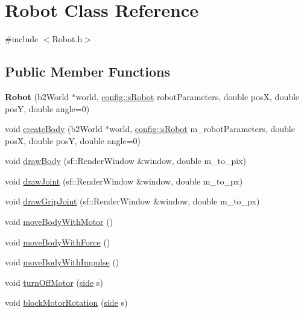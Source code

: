 \hypertarget{class_robot}{}\section{Robot Class Reference}
\label{class_robot}


{\ttfamily \#include $<$Robot.\+h$>$}

\subsection*{Public Member Functions}
\begin{DoxyCompactItemize}
\item 
\mbox{\label{class_robot_ac12d142fb87c4985e61f31c3684fe858}} 
{\bfseries Robot} (b2\+World $\ast$world, \mbox{\hyperlink{structconfig_1_1s_robot}{config\+::s\+Robot}} robot\+Parameters, double posX, double posY, double angle=0)
\item 
void \mbox{\hyperlink{class_robot_a7be383b14986610db597c2b26c475cbe}{create\+Body}} (b2\+World $\ast$world, \mbox{\hyperlink{structconfig_1_1s_robot}{config\+::s\+Robot}} m\+\_\+robot\+Parameters, double posX, double posY, double angle=0)
\item 
void \mbox{\hyperlink{class_robot_aae700fce06eb367ff9282492cc17ccc7}{draw\+Body}} (sf\+::\+Render\+Window \&window, double m\+\_\+to\+\_\+pix)
\item 
void \mbox{\hyperlink{class_robot_a94bec26489e5354d1b9106bbd0e59f00}{draw\+Joint}} (sf\+::\+Render\+Window \&window, double m\+\_\+to\+\_\+px)
\item 
void \mbox{\hyperlink{class_robot_a99e6a9dacaae1c43f249a01485352dcf}{draw\+Grip\+Joint}} (sf\+::\+Render\+Window \&window, double m\+\_\+to\+\_\+px)
\item 
void \mbox{\hyperlink{class_robot_a55036d85a36c4e8ed3ff6f8381331c70}{move\+Body\+With\+Motor}} ()
\item 
void \mbox{\hyperlink{class_robot_ab713edf012849220f5096ea4b2d3e110}{move\+Body\+With\+Force}} ()
\item 
void \mbox{\hyperlink{class_robot_a2d8a6b3ef3bd324ac69119f80dc9f305}{move\+Body\+With\+Impulse}} ()
\item 
void \mbox{\hyperlink{class_robot_a4d3a07ab64d0a9289a20d40e9a9f27dc}{turn\+Off\+Motor}} (\mbox{\hyperlink{_robot_8h_afc015eff6557e84151d2e53b94375445}{side}} s)
\item 
void \mbox{\hyperlink{class_robot_af11fa20795b6b4d07811f3d3089beb48}{block\+Motor\+Rotation}} (\mbox{\hyperlink{_robot_8h_afc015eff6557e84151d2e53b94375445}{side}} s)

\end{DoxyCompactItemize}

